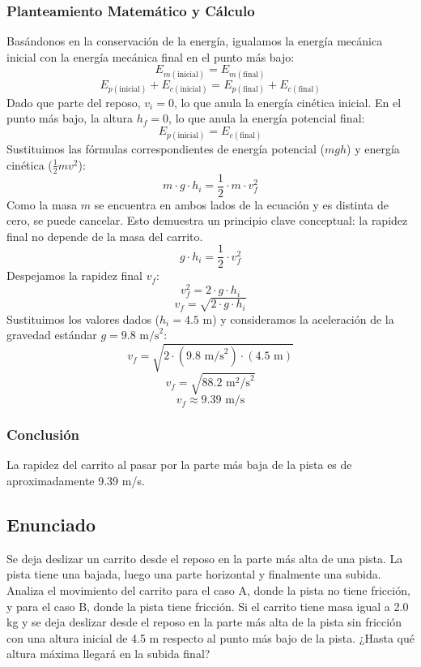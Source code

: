 \documentclass[12pt,a4paper]{article}
\begin{document}
\subsubsection*{Planteamiento Matemático y Cálculo}
Basándonos en la conservación de la energía, igualamos la energía mecánica inicial con la energía mecánica final en el punto más bajo:
$$E_{m(\text{inicial})} = E_{m(\text{final})}$$
$$E_{p(\text{inicial})} + E_{c(\text{inicial})} = E_{p(\text{final})} + E_{c(\text{final})}$$
Dado que parte del reposo, $v_i = 0$, lo que anula la energía cinética inicial. En el punto más bajo, la altura $h_f = 0$, lo que anula la energía potencial final:
$$E_{p(\text{inicial})} = E_{c(\text{final})}$$
Sustituimos las fórmulas correspondientes de energía potencial ($mgh$) y energía cinética ($\frac{1}{2}mv^2$):
$$m \cdot g \cdot h_i = \frac{1}{2} \cdot m \cdot v_f^2$$
Como la masa $m$ se encuentra en ambos lados de la ecuación y es distinta de cero, se puede cancelar. Esto demuestra un principio clave conceptual: la rapidez final no depende de la masa del carrito.
$$g \cdot h_i = \frac{1}{2} \cdot v_f^2$$
Despejamos la rapidez final $v_f$:
$$v_f^2 = 2 \cdot g \cdot h_i$$
$$v_f = \sqrt{2 \cdot g \cdot h_i}$$
Sustituimos los valores dados ($h_i = 4.5 \text{ m}$) y consideramos la aceleración de la gravedad estándar $g = 9.8 \text{ m/s}^2$:
$$v_f = \sqrt{2 \cdot (9.8 \text{ m/s}^2) \cdot (4.5 \text{ m})}$$
$$v_f = \sqrt{88.2 \text{ m}^2\text{/s}^2}$$
$$v_f \approx 9.39 \text{ m/s}$$

\subsubsection*{Conclusión}
La rapidez del carrito al pasar por la parte más baja de la pista es de aproximadamente 9.39 m/s.

\newpage
\subsection*{Enunciado}
Se deja deslizar un carrito desde el reposo en la parte más alta de una pista. La pista tiene una bajada, luego una parte horizontal y finalmente una subida. Analiza el movimiento del carrito para el caso A, donde la pista no tiene fricción, y para el caso B, donde la pista tiene fricción. Si el carrito tiene masa igual a 2.0 kg y se deja deslizar desde el reposo en la parte más alta de la pista sin fricción con una altura inicial de 4.5 m respecto al punto más bajo de la pista. ¿Hasta qué altura máxima llegará en la subida final?
\end{document}
